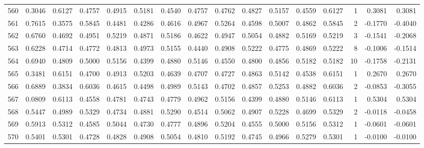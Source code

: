 \begin{tabular}{lrrrrrrrrrrrrrrr}
560 &      0.3046 &  0.6127 &  0.4757 &  0.4915 &  0.5181 &  0.4540 &  0.4757 &  0.4762 &  0.4827 &  0.5157 &   0.4559 &     0.6127 &      1 &                    0.3081 &                     0.3081 \\
561 &      0.7615 &  0.3575 &  0.5845 &  0.4481 &  0.4286 &  0.4616 &  0.4967 &  0.5264 &  0.4598 &  0.5007 &   0.4862 &     0.5845 &      2 &                   -0.1770 &                    -0.4040 \\
562 &      0.6760 &  0.4692 &  0.4951 &  0.5219 &  0.4871 &  0.5186 &  0.4622 &  0.4947 &  0.5054 &  0.4882 &   0.5169 &     0.5219 &      3 &                   -0.1541 &                    -0.2068 \\
563 &      0.6228 &  0.4714 &  0.4772 &  0.4813 &  0.4973 &  0.5155 &  0.4440 &  0.4908 &  0.5222 &  0.4775 &   0.4869 &     0.5222 &      8 &                   -0.1006 &                    -0.1514 \\
564 &      0.6940 &  0.4809 &  0.5000 &  0.5156 &  0.4399 &  0.4880 &  0.5146 &  0.4550 &  0.4800 &  0.4856 &   0.5182 &     0.5182 &     10 &                   -0.1758 &                    -0.2131 \\
565 &      0.3481 &  0.6151 &  0.4700 &  0.4913 &  0.5203 &  0.4639 &  0.4707 &  0.4727 &  0.4863 &  0.5142 &   0.4538 &     0.6151 &      1 &                    0.2670 &                     0.2670 \\
566 &      0.6889 &  0.3834 &  0.6036 &  0.4615 &  0.4498 &  0.4989 &  0.5143 &  0.4702 &  0.4857 &  0.5253 &   0.4882 &     0.6036 &      2 &                   -0.0853 &                    -0.3055 \\
567 &      0.0809 &  0.6113 &  0.4558 &  0.4781 &  0.4743 &  0.4779 &  0.4962 &  0.5156 &  0.4399 &  0.4880 &   0.5146 &     0.6113 &      1 &                    0.5304 &                     0.5304 \\
568 &      0.5447 &  0.4989 &  0.5329 &  0.4734 &  0.4881 &  0.5290 &  0.4514 &  0.5062 &  0.4907 &  0.5228 &   0.4699 &     0.5329 &      2 &                   -0.0118 &                    -0.0458 \\
569 &      0.5913 &  0.5312 &  0.4585 &  0.5044 &  0.4730 &  0.4777 &  0.4896 &  0.5204 &  0.4555 &  0.5000 &   0.5156 &     0.5312 &      1 &                   -0.0601 &                    -0.0601 \\
570 &      0.5401 &  0.5301 &  0.4728 &  0.4828 &  0.4908 &  0.5054 &  0.4810 &  0.5192 &  0.4745 &  0.4966 &   0.5279 &     0.5301 &      1 &                   -0.0100 &                    -0.0100 \\

\end{tabular}
